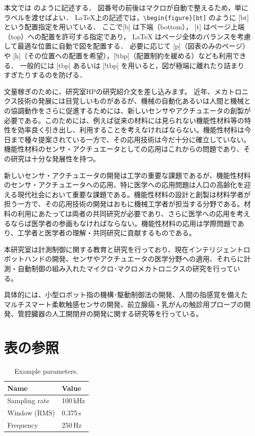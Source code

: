 \documentclass[../main.tex]{subfiles} %
\begin{document}
本文では  のように記述する．
図番号の前後はマクロが自動で整えるため，単にラベルを渡せばよい．
\LaTeX 上の記述では，\verb|\begin{figure}[bt]| のように [bt] という配置指定を用いている．
ここで[b] は下端（bottom）， [t] はページ上端（top）への配置を許可する指定であり，
LaTeX はページ全体のバランスを考慮して最適な位置に自動で図を配置する．
必要に応じて [p]（図表のみのページ）や [h]（その位置への配置を希望），[!tbp]（配置制約を緩める）なども利用できる．
一般的には [tbp] あるいは [!tbp] を用いると，図が極端に離れたり詰まりすぎたりするのを防げる．

文量稼ぎのために、研究室HPの研究紹介文を差し込みます。 近年、メカトロニクス技術の発展には目覚しいものがあるが、機械の自動化あるいは人間と機械との協調動作をさらに促進するためには、新しいセンサやアクチュエータの創製が必要である。このためには、例えば従来の材料には見られない機能性材料等の特性を効率良く引き出し、利用することを考えなければならない。機能性材料は今日まで種々提案されている一方で、その応用技術は今だ十分に確立していない。機能性材料のセンサ・アクチュエータとしての応用はこれからの問題であり、その研究は十分な発展性を持つ。

新しいセンサ・アクチュエータの開発は工学の重要な課題であるが、機能性材料のセンサ・アクチュエータへの応用、特に医学への応用問題は人口の高齢化を迎える現代社会において重要な課題である。機能性材料の設計と創製は材料学者が担う一方で、その応用技術の開発はおもに機械工学者が担当する分野である。材料の利用にあたっては両者の共同研究が必要であり、さらに医学への応用を考えるならば医学者の参画もなければならない。機能性材料の応用は学際問題であり、工学者と医学者の理解・共同研究に貢献するものである。

本研究室は計測制御に関する教育と研究を行っており、現在インテリジェントロボットハンドの開発、センサやアクチュエータの医学分野への適用、それらに計測・自動制御の組み入れたマイクロ･マクロメカトロニクスの研究を行っている。

具体的には、小型ロボット指の機構･駆動制御法の開発、人間の指感覚を備えたマルチスマート柔軟触感センサの開発、前立腺癌・乳がんの触診用プローブの開発、管腔臓器の人工開閉弁の開発に関する研究等を行っている。

\section{表の参照}
\begin{table}[bt]
  \centering
  \caption{Example parameters.}
  \label{tab:example}
  \begin{tabular}{ll}
    \hline
    Name & Value\\
    \hline
    Sampling rate & 100\,kHz\\
    Window (RMS)  & 0.375\,s\\
    Frequency     & 250\,Hz\\
    \hline
  \end{tabular}
\end{table}
\end{document}
